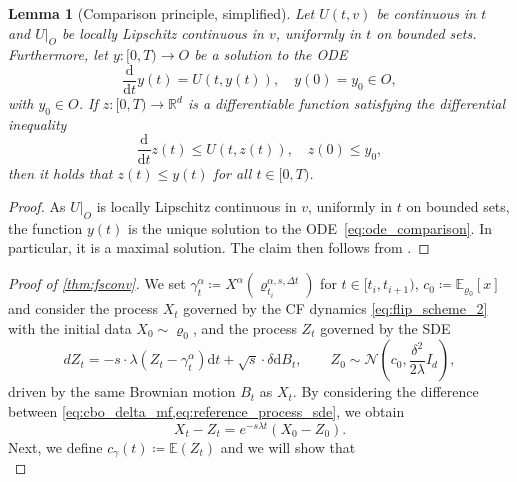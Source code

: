 \documentclass[reqno]{amsart}
\numberwithin{algorithm}{section}
\newcommand{\diff}{\mathrm{d}}
\newcommand{\RR}{\mathbb{R}}
\newcommand{\EE}{{\mathbb E}}
\newcommand{\Xalpha}{{X^\alpha}}
\newcommand{\mc}[1]{\mathcal{#1}}
\newtheorem{lemma}[theorem]{Lemma}
\begin{document}
{\begin{lemma}[Comparison principle, simplified]
    Let $U(t, v)$ be continuous in $t$ and $U|_O$ be locally Lipschitz continuous in $v$, uniformly in $t$ on bounded sets. Furthermore, let $y: [0, T) \to O$ be a solution to the ODE
    \begin{equation}\label{eq:ode_comparison}
        \frac{\diff}{\diff t} y(t) = U(t, y(t)), \quad y(0) = y_0 \in O,
    \end{equation}
    with $y_0 \in O$.
    If $z: [0, T) \to \RR^d$ is a differentiable function satisfying the differential inequality
    \begin{equation}
        \frac{\diff}{\diff t} z(t) \leq U(t, z(t)), \quad z(0) \leq y_0,
    \end{equation}
    then it holds that $z(t) \leq y(t)$ for all $t \in [0, T)$.
\end{lemma}
\begin{proof}
    As $U|_O$ is locally Lipschitz continuous in $v$, uniformly in $t$ on bounded sets, the function $y(t)$ is the unique solution to the ODE~\eqref{eq:ode_comparison}.
    In particular, it is a maximal solution. The claim then follows from \cite[Theorem 4.1]{hartman1964ordinary}.
\end{proof}
\begin{proof}[Proof of \cref{thm:fsconv}]
    We set $\gamma_t^\alpha \coloneqq \Xalpha(\varrho_{t_i}^{\alpha,s,\Delta t})$ for $t \in [t_i, t_{i+1})$, $c_0 \coloneqq \EE_{\varrho_0}[x]$ and consider the process $X_t$ governed by the CF dynamics \cref{eq:flip_scheme_2} with the initial data $X_0 \sim \varrho_0$, and the process $Z_t$ governed by the SDE
    \begin{equation}\label{eq:reference_process_sde}
        dZ_t = - s \cdot \lambda (Z_t - \gamma_t^\alpha) \diff t + \sqrt{s} \cdot \delta \diff B_t, \qquad Z_0 \sim \mc{N}(c_0, \frac{\delta^2}{2\lambda} I_d),
    \end{equation}
    driven by the same Brownian motion $B_t$ as $X_t$. By considering the difference between \cref{eq:cbo_delta_mf,eq:reference_process_sde}, we obtain
    \begin{equation}\label{eq:exponential_decay_diff}
        X_t - Z_t = e^{-s \lambda t} (X_0 - Z_0).
    \end{equation}
    Next, we define $c_\gamma(t) \coloneqq \EE(Z_t)$ and we will show that
    \begin{equation}\label{eq:differential_equation_c_gamma}

\end{equation}
\end{proof}}
\end{document}
